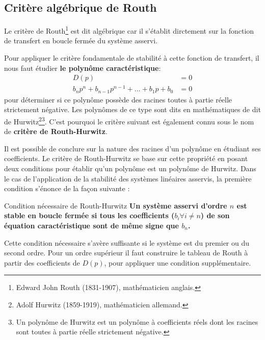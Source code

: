 \subsection{Critère algébrique de Routh}

Le critère de Routh\footnote{Edward John Routh (1831-1907), mathématicien anglais.}
est dit algébrique car il s'établit dirctement sur la fonction de transfert en 
boucle fermée du système asservi. 

Pour appliquer le critère fondamentale de stabilité à cette fonction de transfert,
il nous faut étudier \textbf{le polynôme caractéristique}:
\begin{align}
    D(p)&=0 \nonumber\\
    b_np^n+b_{n-1}p^{n-1}+\ldots+b_1p+b_0 &= 0
\end{align}
pour déterminer si ce polynôme possède des racines toutes à partie réelle 
strictement négative. Les polynômes de ce type sont dits en mathématiques 
de dit de Hurwitz\footnote{Adolf Hurwitz (1859-1919), mathématicien allemand.}\footnote{Un polynôme de 
Hurwitz est un polynôme à coefficients 
réels dont les racines sont toutes à partie réelle strictement négative.}.
C'est pourquoi le critère suivant est également connu sous le nom de \textbf{critère de Routh-Hurwitz}.

Il est possible de conclure sur la nature des racines d'un polynôme 
en étudiant ses coefficients. Le critère de Routh-Hurwitz se base sur cette propriété en 
posant deux conditions pour établir qu'un polynôme est un polynôme de Hurwitz.
Dans le cas de l'application de la stabilité des systèmes linéaires asservis, la première condition s'énonce 
de la façon suivante :
\begin{criteria}{Condition nécessaire de Routh-Hurwitz }
    \textbf{Un système asservi d'ordre $n$ est stable en boucle fermée 
    si tous les coefficients ($b_i\forall i\neq n$) de son équation caractéristique 
    sont de même signe que $b_n$.}
\end{criteria}

Cette condition nécessaire s'avère suffisante si le système est du premier ou du second ordre.
Pour un ordre supérieur il faut construire le tableau de Routh à partir des coefficients de $D(p)$,
pour appliquer une condition supplémentaire. 


